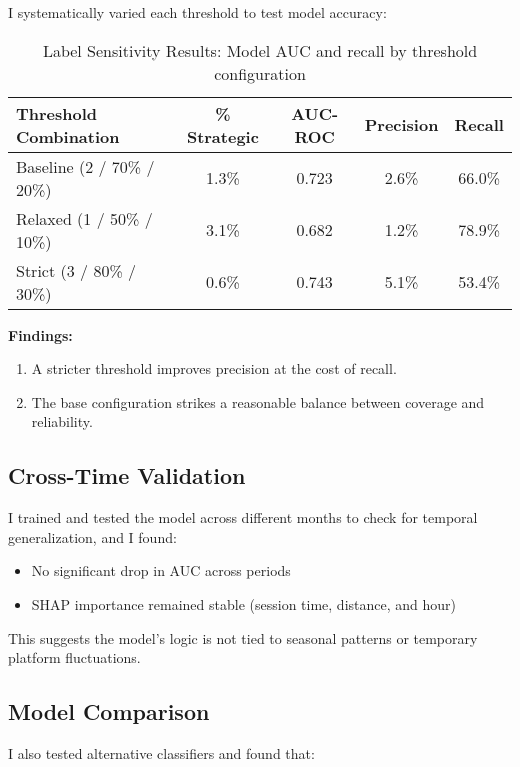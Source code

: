 \documentclass[12pt,letterpaper]{article}
\begin{document}
I systematically varied each threshold to test model accuracy:

\begin{table}[H]
\centering
\caption{Label Sensitivity Results: Model AUC and recall by threshold configuration}
\label{tab:label_sensitivity}
\begin{tabular}{lcccc}
\toprule
Threshold Combination & \% Strategic & AUC-ROC & Precision & Recall \\
\midrule
Baseline (2 / 70\% / 20\%) & 1.3\% & 0.723 & 2.6\% & 66.0\% \\
Relaxed (1 / 50\% / 10\%) & 3.1\% & 0.682 & 1.2\% & 78.9\% \\
Strict (3 / 80\% / 30\%) & 0.6\% & 0.743 & 5.1\% & 53.4\% \\
\bottomrule
\end{tabular}
\end{table}

\textbf{Findings:} 

\begin{enumerate}
    \item A stricter threshold improves precision at the cost of recall.
    \item The base configuration strikes a reasonable balance between coverage and reliability.
\end{enumerate}

\subsection{Cross-Time Validation}

I trained and tested the model across different months to check for temporal generalization, and I found:

\begin{itemize}
    \item No significant drop in AUC across periods
    \item SHAP importance remained stable (session time, distance, and hour)
\end{itemize}

This suggests the model's logic is not tied to seasonal patterns or temporary platform fluctuations.

\subsection{Model Comparison}

I also tested alternative classifiers and found that:
\end{document}
